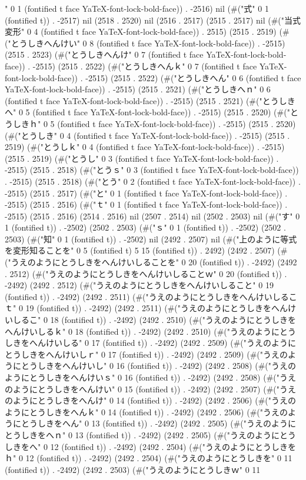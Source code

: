 " 0 1 (fontified t face YaTeX-font-lock-bold-face)) . -2516) nil (#("式" 0 1 (fontified t)) . -2517) nil (2518 . 2520) nil (2516 . 2517) (2515 . 2517) nil (#("当式変形" 0 4 (fontified t face YaTeX-font-lock-bold-face)) . 2515) (2515 . 2519) (#("とうしきへんけい" 0 8 (fontified t face YaTeX-font-lock-bold-face)) . -2515) (2515 . 2523) (#("とうしきへんけ" 0 7 (fontified t face YaTeX-font-lock-bold-face)) . -2515) (2515 . 2522) (#("とうしきへんｋ" 0 7 (fontified t face YaTeX-font-lock-bold-face)) . -2515) (2515 . 2522) (#("とうしきへん" 0 6 (fontified t face YaTeX-font-lock-bold-face)) . -2515) (2515 . 2521) (#("とうしきへｎ" 0 6 (fontified t face YaTeX-font-lock-bold-face)) . -2515) (2515 . 2521) (#("とうしきへ" 0 5 (fontified t face YaTeX-font-lock-bold-face)) . -2515) (2515 . 2520) (#("とうしきｈ" 0 5 (fontified t face YaTeX-font-lock-bold-face)) . -2515) (2515 . 2520) (#("とうしき" 0 4 (fontified t face YaTeX-font-lock-bold-face)) . -2515) (2515 . 2519) (#("とうしｋ" 0 4 (fontified t face YaTeX-font-lock-bold-face)) . -2515) (2515 . 2519) (#("とうし" 0 3 (fontified t face YaTeX-font-lock-bold-face)) . -2515) (2515 . 2518) (#("とうｓ" 0 3 (fontified t face YaTeX-font-lock-bold-face)) . -2515) (2515 . 2518) (#("とう" 0 2 (fontified t face YaTeX-font-lock-bold-face)) . -2515) (2515 . 2517) (#("と" 0 1 (fontified t face YaTeX-font-lock-bold-face)) . -2515) (2515 . 2516) (#("ｔ" 0 1 (fontified t face YaTeX-font-lock-bold-face)) . -2515) (2515 . 2516) (2514 . 2516) nil (2507 . 2514) nil (2502 . 2503) nil (#("す" 0 1 (fontified t)) . -2502) (2502 . 2503) (#("ｓ" 0 1 (fontified t)) . -2502) (2502 . 2503) (#("知" 0 1 (fontified t)) . -2502) nil (2492 . 2507) nil (#("上のように等式を変形知ることを" 0 5 (fontified t) 5 15 (fontified t)) . 2492) (2492 . 2507) (#("うえのようにとうしきをへんけいしることを" 0 20 (fontified t)) . -2492) (2492 . 2512) (#("うえのようにとうしきをへんけいしることｗ" 0 20 (fontified t)) . -2492) (2492 . 2512) (#("うえのようにとうしきをへんけいしること" 0 19 (fontified t)) . -2492) (2492 . 2511) (#("うえのようにとうしきをへんけいしるこｔ" 0 19 (fontified t)) . -2492) (2492 . 2511) (#("うえのようにとうしきをへんけいしるこ" 0 18 (fontified t)) . -2492) (2492 . 2510) (#("うえのようにとうしきをへんけいしるｋ" 0 18 (fontified t)) . -2492) (2492 . 2510) (#("うえのようにとうしきをへんけいしる" 0 17 (fontified t)) . -2492) (2492 . 2509) (#("うえのようにとうしきをへんけいしｒ" 0 17 (fontified t)) . -2492) (2492 . 2509) (#("うえのようにとうしきをへんけいし" 0 16 (fontified t)) . -2492) (2492 . 2508) (#("うえのようにとうしきをへんけいｓ" 0 16 (fontified t)) . -2492) (2492 . 2508) (#("うえのようにとうしきをへんけい" 0 15 (fontified t)) . -2492) (2492 . 2507) (#("うえのようにとうしきをへんけ" 0 14 (fontified t)) . -2492) (2492 . 2506) (#("うえのようにとうしきをへんｋ" 0 14 (fontified t)) . -2492) (2492 . 2506) (#("うえのようにとうしきをへん" 0 13 (fontified t)) . -2492) (2492 . 2505) (#("うえのようにとうしきをへｎ" 0 13 (fontified t)) . -2492) (2492 . 2505) (#("うえのようにとうしきをへ" 0 12 (fontified t)) . -2492) (2492 . 2504) (#("うえのようにとうしきをｈ" 0 12 (fontified t)) . -2492) (2492 . 2504) (#("うえのようにとうしきを" 0 11 (fontified t)) . -2492) (2492 . 2503) (#("うえのようにとうしきｗ" 0 11 